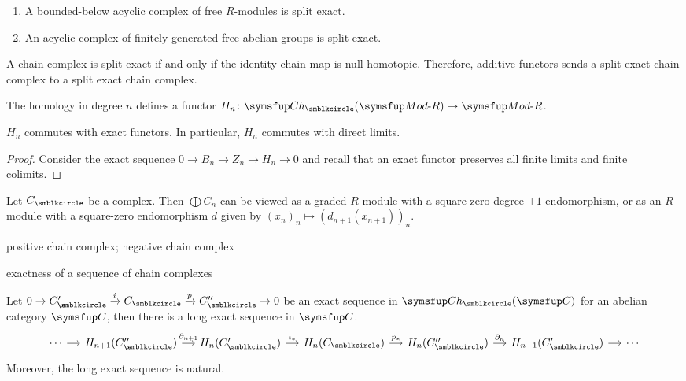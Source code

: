 \begin{proposition}\hspace*{\fill}
  \begin{enumerate}
    \item A bounded-below acyclic complex of free $R$-modules is split exact.
    \item An acyclic complex of finitely generated free abelian groups is split exact.
  \end{enumerate}
\end{proposition}

\begin{proposition}
  A chain complex is split exact if and only if the identity chain map is null-homotopic. Therefore, additive functors sends a split exact chain complex to a split exact chain complex.
\end{proposition}

The homology in degree $n$ defines a functor $H_n\colon\CH(\MODR)\to\MODR$.

\begin{proposition}
  $H_n$ commutes with exact functors. In particular, $H_n$ commutes with direct limits.
\end{proposition}

\begin{proof}
  Consider the exact sequence $0\to B_n\to Z_n\to H_n\to 0$ and recall that an exact functor preserves all finite limits and finite colimits.
\end{proof}

Let $C_\CCCIR$ be a complex. Then $\bigoplus C_n$ can be viewed as a graded $R$-module with a square-zero degree $+1$ endomorphism, or as an $R$-module with a square-zero endomorphism $d$ given by $(x_n)_n\mapsto (d_{n+1}(x_{n+1}))_n$.

positive chain complex; negative chain complex

exactness of a sequence of chain complexes

\begin{lemma}
  Let $0\to C_\CCCIR'\xrightarrow{i} C_\CCCIR \xrightarrow{p} C_\CCCIR''\to 0$ be an exact sequence in $\CH(\CAT{C})$ for an abelian category $\CAT{C}$, then there is a long exact sequence in $\CAT{C}$.
  \begin{equation*}
    \begin{tikzcd}[sep=small]
      \dotsb & H_{n+1}(C_\CCCIR'') & H_n(C_\CCCIR') & H_n(C_\CCCIR) & H_n(C_\CCCIR'') & H_{n-1}(C_\CCCIR') & \dotsb
      \arrow[from=1-1,]{1-2}[]{}
      \arrow[from=1-2,]{1-3}[]{\partial_{n+1}}
      \arrow[from=1-3,]{1-4}[]{i_*}
      \arrow[from=1-4,]{1-5}[]{p_*}
      \arrow[from=1-5,]{1-6}[]{\partial_n}
      \arrow[from=1-6,]{1-7}[]{}
    \end{tikzcd}
  \end{equation*}
  Moreover, the long exact sequence is natural.
\end{lemma}

